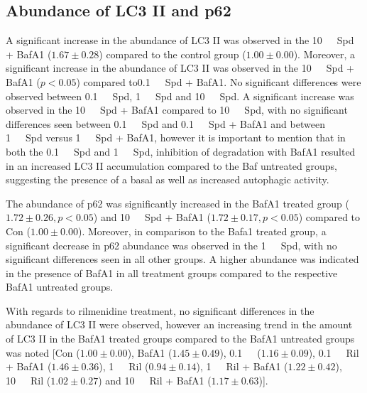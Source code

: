 \subsection{Abundance of LC3 II and p62}
A significant increase in the abundance of LC3 II was observed in the  \SI{10}{\mu\Molar}\  Spd + BafA1 ($1.67 \pm 0.28$) compared to the control group ($1.00 \pm 0.00$). Moreover, a significant increase in the abundance of LC3 II was observed in the \SI{10}{\mu\Molar}\ Spd + BafA1 ($p < 0.05$) compared to\SI{0.1}{\mu\Molar}\ Spd + BafA1. No significant differences were observed between \SI{0.1}{\mu\Molar}\ Spd, \SI{1}{\mu\Molar}\ Spd and \SI{10}{\mu\Molar}\ Spd. A significant increase was observed in the \SI{10}{\mu\Molar}\ Spd + BafA1 compared to \SI{10}{\mu\Molar}\ Spd, with no significant differences seen between \SI{0.1}{\mu\Molar}\ Spd and \SI{0.1}{\mu\Molar}\ Spd + BafA1 and between \SI{1}{\mu\Molar}\ Spd versus \SI{1}{\mu\Molar}\ Spd + BafA1, however it is important to mention that in both the \SI{0.1}{\mu\Molar}\ Spd  and \SI{1}{\mu\Molar}\ Spd, inhibition of degradation with BafA1 resulted in an increased LC3 II accumulation compared to the Baf untreated groups, suggesting the presence of a basal as well as increased autophagic activity.

The abundance of p62 was significantly increased in the BafA1 treated group ($1.72 \pm 0.26, p < 0.05$) and  \SI{10}{\mu\Molar}\ Spd + BafA1 ($1.72 \pm 0.17, p< 0.05$) compared to Con ($1.00 \pm 0.00$). Moreover, in comparison to the Bafa1 treated group, a significant decrease in p62 abundance was observed in the \SI{1}{\mu\Molar}\ Spd, with no significant differences seen in all other groups. A higher abundance was indicated in the presence of BafA1 in all treatment groups compared to the respective BafA1 untreated groups.

With regards to rilmenidine treatment, no significant differences in the abundance of LC3 II were observed, however an increasing trend in the amount of LC3 II in the BafA1 treated groups compared to the BafA1 untreated groups was noted [Con ($1.00 \pm 0.00$), BafA1 ($1.45 \pm 0.49$), \SI{0.1}{\mu\Molar}\ ($1.16 \pm 0.09$), \SI{0.1}{\mu\Molar}\ Ril + BafA1 ($1.46 \pm 0.36$), \SI{1}{\mu\Molar}\ Ril ($0.94 \pm 0.14$), \SI{1}{\mu\Molar}\ Ril + BafA1 ($1.22 \pm 0.42$), \SI{10}{\mu\Molar}\ Ril ($1.02 \pm 0.27$) and \SI{10}{\mu\Molar}\ Ril + BafA1 ($1.17 \pm 0.63$)].

